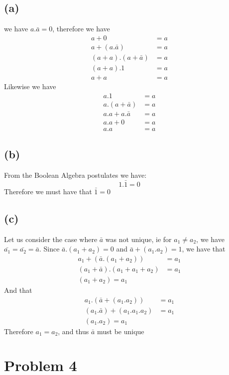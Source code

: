 \documentclass[12pt]{article}
\begin{document}
\subsection*{(a)}
we have $a.\bar{a}=0$, therefore we have
\begin{align*}
    a+0&=a\\
    a+(a.\bar{a})&=a\\
    (a+a).(a+\bar{a})&=a\\
    (a+a).1&=a\\
    a+a&=a
\end{align*}
Likewise we have
\begin{align*}
    a.1&=a\\
    a.(a+\bar{a})&=a\\
    a.a+a.\bar{a}&=a\\
    a.a+0&=a\\
    a.a&=a
\end{align*}
\subsection*{(b)}
From the Boolean Algebra postulates we have: 
$$1.\bar{1}=0$$
Therefore we must have that $\bar{1}=0$
\subsection*{(c)}
Let us consider the case where $\bar{a}$ was not unique, ie for $a_1\neq a_2$, we have
$\bar{a_1}=\bar{a_2}=\bar{a}$. Since $\bar{a}.(a_1+a_2)=0$ and $\bar{a}+(a_1.a_2)=1$, we
have that 
\begin{align*}
    a_1+(\bar{a}.(a_1+a_2))&=a_1\\
    (a_1+\bar{a}).(a_1+a_1+a_2)&=a_1\\
    (a_1+a_2)=a_1
\end{align*}
And that 
\begin{align*}
    a_1.(\bar{a}+(a_1.a_2))&=a_1\\
    (a_1.\bar{a})+(a_1.a_1.a_2)&=a_1\\
    (a_1.a_2)=a_1
\end{align*}
Therefore $a_1=a_2$, and thus $\bar{a}$ must be unique
\section*{Problem 4}
\end{document}
